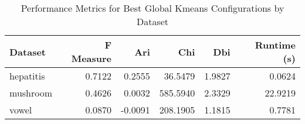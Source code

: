 \begin{table*}[ht!]
\caption{Performance Metrics for Best Global Kmeans Configurations by Dataset}
\label{tab:best_configs_global_kmeans_performance}
\begin{tabular}{lrrrrr}
Dataset & F Measure & Ari & Chi & Dbi & Runtime (s) \\\midrule

hepatitis & 0.7122 & 0.2555 & 36.5479 & 1.9827 & 0.0624 \\
mushroom & 0.4626 & 0.0032 & 585.5940 & 2.3329 & 22.9219 \\
vowel & 0.0870 & -0.0091 & 208.1905 & 1.1815 & 0.7781 \\
\end{tabular}
\end{table*}
